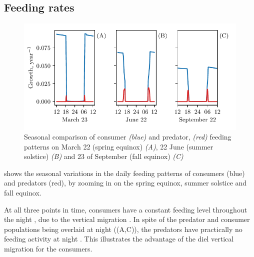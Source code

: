 \subsection*{Feeding rates}
\begin{figure}[H]
\includegraphics{plots/growth_short_rational.pdf}
\caption{Seasonal comparison of consumer \emph{(blue)} and predator, \emph{(red)} feeding patterns on March 22 (spring equinox) \emph{(A)}, 22 June (summer solstice) \emph{(B)} and 23 of September (fall equinox) \emph{(C)}}
\label{fig:growth_short_rational}
\end{figure}
 shows the seasonal variations in the daily feeding patterns of consumers (blue) and predators (red), by zooming in on the spring equinox, summer solstice and fall equinox.

At all three points in time, consumers have a constant feeding level throughout the night , due to the vertical migration . In spite of the predator and consumer populations being overlaid at night ((A,C)), the predators have practically no feeding activity at night . This illustrates the advantage of the diel vertical migration for the consumers.

